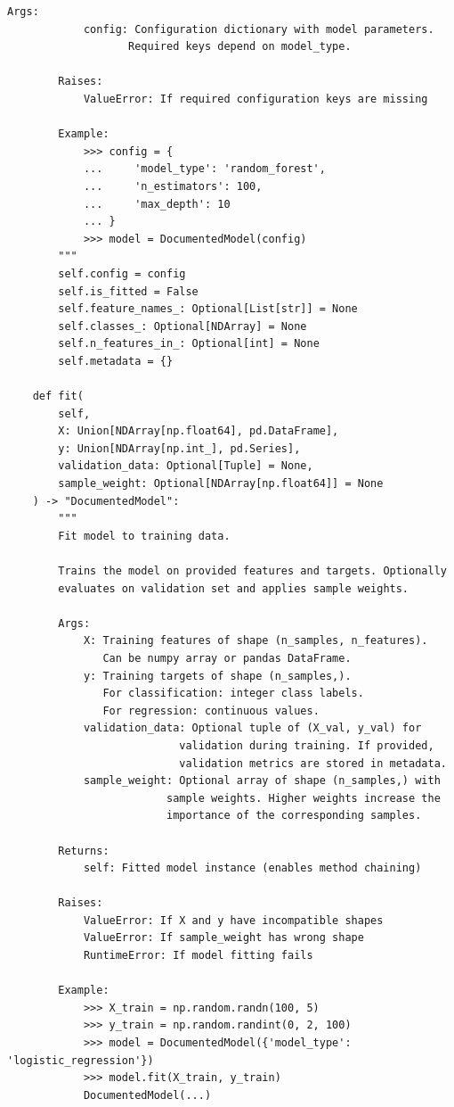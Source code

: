 \begin{lstlisting}[style=python, caption=Comprehensive docstring examples]
        Args:
            config: Configuration dictionary with model parameters.
                   Required keys depend on model_type.

        Raises:
            ValueError: If required configuration keys are missing

        Example:
            >>> config = {
            ...     'model_type': 'random_forest',
            ...     'n_estimators': 100,
            ...     'max_depth': 10
            ... }
            >>> model = DocumentedModel(config)
        """
        self.config = config
        self.is_fitted = False
        self.feature_names_: Optional[List[str]] = None
        self.classes_: Optional[NDArray] = None
        self.n_features_in_: Optional[int] = None
        self.metadata = {}

    def fit(
        self,
        X: Union[NDArray[np.float64], pd.DataFrame],
        y: Union[NDArray[np.int_], pd.Series],
        validation_data: Optional[Tuple] = None,
        sample_weight: Optional[NDArray[np.float64]] = None
    ) -> "DocumentedModel":
        """
        Fit model to training data.

        Trains the model on provided features and targets. Optionally
        evaluates on validation set and applies sample weights.

        Args:
            X: Training features of shape (n_samples, n_features).
               Can be numpy array or pandas DataFrame.
            y: Training targets of shape (n_samples,).
               For classification: integer class labels.
               For regression: continuous values.
            validation_data: Optional tuple of (X_val, y_val) for
                           validation during training. If provided,
                           validation metrics are stored in metadata.
            sample_weight: Optional array of shape (n_samples,) with
                         sample weights. Higher weights increase the
                         importance of the corresponding samples.

        Returns:
            self: Fitted model instance (enables method chaining)

        Raises:
            ValueError: If X and y have incompatible shapes
            ValueError: If sample_weight has wrong shape
            RuntimeError: If model fitting fails

        Example:
            >>> X_train = np.random.randn(100, 5)
            >>> y_train = np.random.randint(0, 2, 100)
            >>> model = DocumentedModel({'model_type': 'logistic_regression'})
            >>> model.fit(X_train, y_train)
            DocumentedModel(...)


\end{lstlisting}
